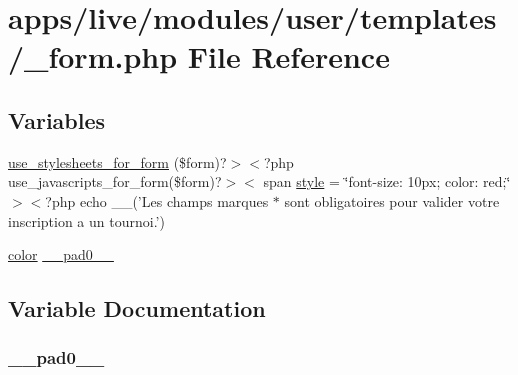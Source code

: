 \hypertarget{live_2modules_2user_2templates_2__form_8php}{\section{apps/live/modules/user/templates/\-\_\-form.php File Reference}
\label{live_2modules_2user_2templates_2__form_8php}
}
\subsection*{Variables}
\begin{DoxyCompactItemize}
\item 
\hyperlink{live_2modules_2user_2templates_2__form_8php_a86bc4522fdbe625b07bc4a4d6eec3df7}{use\-\_\-stylesheets\-\_\-for\-\_\-form} (\$form)?$>$$<$?php use\-\_\-javascripts\-\_\-for\-\_\-form(\$form)?$>$$<$ span \hyperlink{backend_2modules_2news_2templates_2__form_8php_a8ba9b58991c02462588258e164fe3f84}{style} = \char`\"{}font-\/size\-: 10px; color\-: red;\char`\"{}$>$$<$?php echo \-\_\-\-\_\-('\-Les champs marques $\ast$ sont obligatoires pour valider votre inscription a un tournoi.')
\item 
\hyperlink{preview_success_8php_ac04e2a463631b69c8f70784275a056d6}{color} \hyperlink{live_2modules_2user_2templates_2__form_8php_a82281c80e5a34da73d7f831c14a3514a}{\-\_\-\-\_\-pad0\-\_\-\-\_\-}
\end{DoxyCompactItemize}


\subsection{Variable Documentation}
\hypertarget{live_2modules_2user_2templates_2__form_8php_a82281c80e5a34da73d7f831c14a3514a}{
\subsubsection[{\-\_\-\-\_\-pad0\-\_\-\-\_\-}]{ \-\_\-\-\_\-pad0\-\_\-\-\_\-}}\label{live_2modules_2user_2templates_2__form_8php_a82281c80e5a34da73d7f831c14a3514a}


